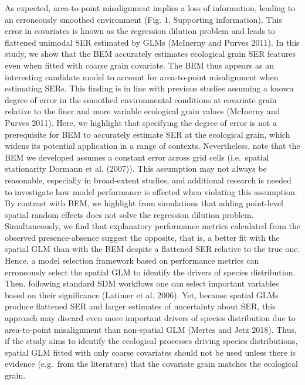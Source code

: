 \documentclass[
  12pt,
  a4paper]{article}
\begin{document}
As expected, area-to-point misalignment implies a loss of information, leading to an erroneously smoothed environment (Fig. 1, Supporting information). This error in covariates is known as the regression dilution problem and leads to flattened unimodal SER estimated by GLMs (McInerny and Purves 2011). In this study, we show that the BEM accurately estimates ecological grain SER features even when fitted with coarse grain covariate. The BEM thus appears as an interesting candidate model to account for area-to-point misalignment when estimating SERs. This finding is in line with previous studies assuming a known degree of error in the smoothed environmental conditions at covariate grain relative to the finer and more variable ecological grain values (McInerny and Purves 2011). Here, we highlight that specifying the degree of error is not a prerequisite for BEM to accurately estimate SER at the ecological grain, which widens its potential application in a range of contexts. Nevertheless, note that the BEM we developed assumes a constant error across grid cells (i.e.~spatial stationarity Dormann et al. (2007)). This assumption may not always be reasonable, especially in broad-extent studies, and additional research is needed to investigate how model performance is affected when violating this assumption. By contrast with BEM, we highlight from simulations that adding point-level spatial random effects does not solve the regression dilution problem. Simultaneously, we find that explanatory performance metrics calculated from the observed presence-absence suggest the opposite, that is, a better fit with the spatial GLM than with the BEM despite a flattened SER relative to the true one. Hence, a model selection framework based on performance metrics can erroneously select the spatial GLM to identify the drivers of species distribution. Then, following standard SDM workflows one can select important variables based on their significance (Latimer et al. 2006). Yet, because spatial GLMs produce flattened SER and larger estimates of uncertainty about SER, this approach may discard even more important drivers of species distribution due to area-to-point misalignment than non-spatial GLM (Mertes and Jetz 2018). Thus, if the study aims to identify the ecological processes driving species distributions, spatial GLM fitted with only coarse covariates should not be used unless there is evidence (e.g.~from the literature) that the covariate grain matches the ecological grain.
\end{document}

